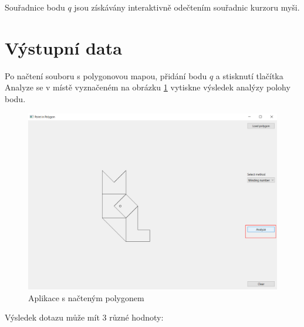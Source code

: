 \documentclass[11pt]{article}
\begin{document}
Souřadnice bodu $q$ jsou získávány interaktivně odečtením souřadnic kurzoru myši.   

\clearpage


\section{Výstupní data}

Po načtení souboru s polygonovou mapou, přidání bodu $q$ a stisknutí tlačítka Analyze se v místě vyznačeném na obrázku \ref{fig:app_analyze} vytiskne výsledek analýzy polohy bodu. 

\begin{figure}[htbh]
	\centering
	\includegraphics[scale=0.4]{images/aplikace_klik_analyze.png} 
	\caption{Aplikace s načteným polygonem}
	\label{fig:app_analyze}
\end{figure} 

Výsledek dotazu může mít 3 různé hodnoty:
\end{document}
